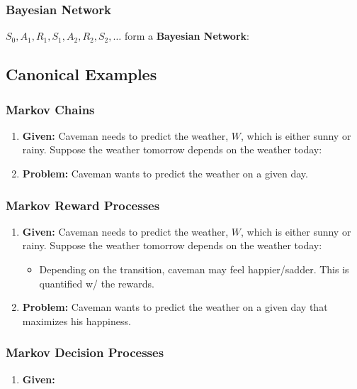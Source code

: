 \subsubsection{Bayesian Network}
\begin{definition}
    $S_0,A_1,R_1,S_1,A_2,R_2,S_2,\ldots$ form a \textbf{Bayesian Network}:
\end{definition}
\newpage

\subsection{Canonical Examples}
\subsubsection{Markov Chains}
\begin{example}
    \begin{enumerate}
        \item \textbf{Given:} Caveman needs to predict the weather, $W$, which is either sunny or rainy. Suppose the weather tomorrow depends on the weather today:
        \item \textbf{Problem:} Caveman wants to predict the weather on a given day.
    \end{enumerate}
\end{example}

\subsubsection{Markov Reward Processes}
\begin{example}
    \begin{enumerate}
        \item \textbf{Given:} Caveman needs to predict the weather, $W$, which is either sunny or rainy. Suppose the weather tomorrow depends on the weather today:
        \begin{itemize}
            \item Depending on the transition, caveman may feel happier/sadder. This is quantified w/ the rewards.
        \end{itemize}
        \item \textbf{Problem:} Caveman wants to predict the weather on a given day that maximizes his happiness.
    \end{enumerate}
\end{example}
\newpage

\subsubsection{Markov Decision Processes}
\begin{example}
    \begin{enumerate}
        \item \textbf{Given:}
    \end{enumerate}
\end{example}


